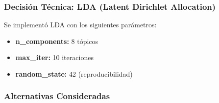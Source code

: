 \subsubsection{Decisión Técnica: LDA (Latent Dirichlet Allocation)}
\label{subsubsec:lda_decision}

Se implementó LDA con los siguientes parámetros:
\begin{itemize}
    \item \textbf{n\_components:} 8 tópicos
    \item \textbf{max\_iter:} 10 iteraciones
    \item \textbf{random\_state:} 42 (reproducibilidad)
\end{itemize}

\subsubsection{Alternativas Consideradas}
\label{subsubsec:alternativas_topicos}

